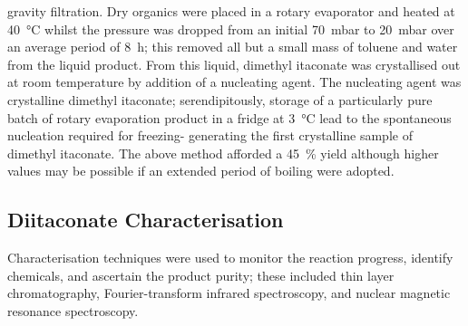  gravity filtration.
Dry organics were placed in a rotary evaporator and heated at
 40~\unit{\degreeCelsius} whilst the pressure was dropped from an initial
 70~\unit{\milli\bar} to 20~\unit{\milli\bar} over an average period of
 8~\unit{\hour}; this removed all but a small mass of toluene and water
 from the liquid product.
From this liquid, dimethyl itaconate was crystallised out at room
 temperature by addition of a nucleating agent.
The nucleating agent was crystalline dimethyl itaconate; serendipitously,
 storage of a particularly pure batch of rotary evaporation product in a
 fridge at 3~\unit{\degreeCelsius} lead to the spontaneous nucleation
 required for freezing- generating the first crystalline sample of dimethyl
 itaconate.
The above method afforded a 45~\unit{\percent} yield although higher values
 may be possible if an extended period of boiling were adopted.

\subsection{Diitaconate Characterisation}
Characterisation techniques were used to monitor the reaction progress,
 identify chemicals, and ascertain the product purity; these included
 thin layer chromatography, Fourier-transform infrared spectroscopy, and
 nuclear magnetic resonance spectroscopy.

